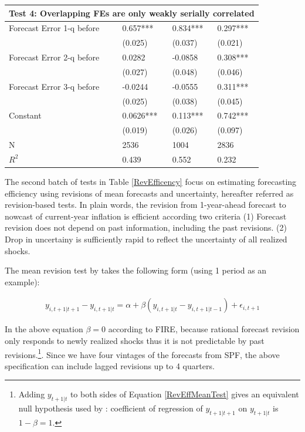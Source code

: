\documentclass[]{article}
\begin{document}
\begin{table}[ht]
\begin{tabular}{llll}
			\hline 
			\multicolumn{4}{l}{Test 4: Overlapping FEs are only weakly serially correlated}                          \\
			\hline 
			Forecast Error 1-q before           & 0.657***         & 0.834***         & 0.297***       \\
			& (0.025)          & (0.037)          & (0.021)        \\
			Forecast Error 2-q before           & 0.0282           & -0.0858          & 0.308***       \\
			& (0.027)          & (0.048)          & (0.046)        \\
			Forecast Error 3-q before           & -0.0244          & -0.0555          & 0.311***       \\
			& (0.025)          & (0.038)          & (0.045)        \\
			Constant                            & 0.0626***        & 0.113***         & 0.742***       \\
			& (0.019)          & (0.026)          & (0.097)        \\
			\hline 
			N                                   & 2536             & 1004             & 2836           \\
			$R^2$                & 0.439            & 0.552            & 0.232    \\
			\hline      
		\end{tabular}
	\end{table}
	
	The second batch of tests in Table \ref{RevEfficency} focus on estimating forecasting efficiency using revisions of mean forecasts and uncertainty, hereafter referred as revision-based tests.  In plain words, the revision from 1-year-ahead forecast to nowcast of current-year inflation is efficient according two criteria (1) Forecast revision does not depend on past information, including the past revisions. (2) Drop in uncertainy is sufficiently rapid to reflect the uncertainty of all realized shocks. 
	
	The mean revision test by \citet{fuhrer2018intrinsic} takes the following form (using 1 period as an example): 
	
	\begin{eqnarray}\label{RevEffMeanTest}
		y_{i,t+1|t+1} - y_{i,t+1|t}=\alpha + \beta (y_{i,t+1|t} - y_{i,t+1|t-1})+\epsilon_{i,t+1}
	\end{eqnarray}
	
	In the above equation $\beta =0$ according to FIRE, because rational forecast revision only responds to newly realized shocks thus it is not predictable by past revisions.\footnote{Adding $y_{t+1|t}$ to both sides of Equation \ref{RevEffMeanTest} gives an equivalent null hypothesis used by \citet{fuhrer2018intrinsic}: coefficient of regression of $y_{t+1|t+1}$ on  $y_{t+1|t}$ is $1-\beta=1$. }. Since we have four vintages of the forecasts from SPF, the above specification can include lagged revisions up to 4 quarters.  
	
\end{document}
